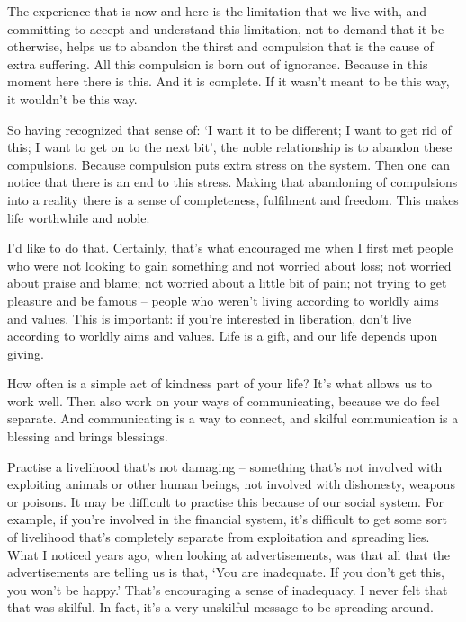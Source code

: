 The experience that is now and here is the limitation that we live with, and
committing to accept and understand this limitation, not to demand that it be otherwise, helps
us to abandon the thirst and compulsion that is the cause of extra suffering.
All this compulsion is born out of ignorance. Because in this moment here there is this. And
it is complete. If it wasn't meant to be this way, it wouldn't be this way.

So having recognized that sense of: `I want it to be different; I want to get
rid of this; I want to get on to the next bit', the noble relationship is to
abandon these compulsions. Because compulsion puts extra stress on the system.
Then one can notice that there is an end to this stress. Making that abandoning of compulsions
into a reality there is a sense of completeness, fulfilment and freedom. This
makes life worthwhile and noble.

\enlargethispage{2\baselineskip}

I'd like to do that. Certainly, that's what encouraged me when I first met
people who were not looking to gain something and not worried about loss; not
worried about praise and blame; not worried about a little bit of pain; not
trying to get pleasure and be famous -- people who weren't living according to
worldly aims and values. This is important: if you're interested in liberation,
don't live according to worldly aims and values. Life is a gift, and our life
depends upon giving.

How often is a simple act of kindness part of your life? It's what allows us to
work well. Then also work on your ways of communicating, because we do feel
separate. And communicating is a way to connect, and skilful communication is a blessing and brings blessings.

Practise a livelihood that's not damaging -- something that's not
involved with exploiting animals or other human beings, not involved with
dishonesty, weapons or poisons. 
It may be difficult to practise this because of our social system. For example,
if you're involved in the financial system, it's difficult to get some sort of
livelihood that's completely separate from exploitation and spreading lies. What
I noticed years ago, when looking at advertisements, was that all that the
advertisements are telling us is that, `You are inadequate. If you don't get
this, you won't be happy.' That's encouraging a sense of inadequacy. I never
felt that that was skilful. In fact, it's a very unskilful message to be
spreading around. 

